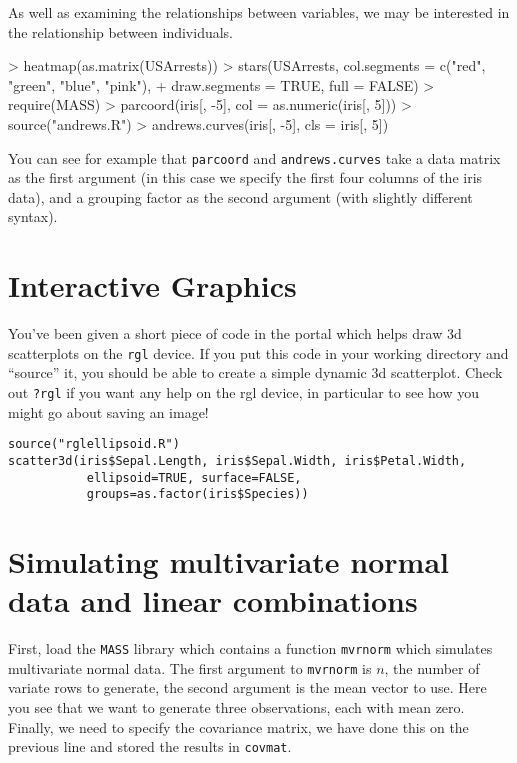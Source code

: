 As well as examining the relationships between variables, we may be interested in the relationship between individuals.

\begin{Schunk}
\begin{Sinput}
> heatmap(as.matrix(USArrests))
> stars(USArrests, col.segments = c("red", "green", "blue", "pink"), 
+     draw.segments = TRUE, full = FALSE)
> require(MASS)
> parcoord(iris[, -5], col = as.numeric(iris[, 5]))
> source("andrews.R")
> andrews.curves(iris[, -5], cls = iris[, 5])
\end{Sinput}
\end{Schunk}

You can see for example that \texttt{parcoord} and \texttt{andrews.curves} take a data matrix as the first argument (in this case we specify the first four columns of the iris data), and a grouping factor as the second argument (with slightly different syntax).


\section{Interactive Graphics}

You've been given a short piece of code in the portal which helps draw 3d scatterplots on the \texttt{rgl} device.   If you put this code in your working directory and ``source'' it, you should be able to create a simple dynamic 3d scatterplot.   Check out \texttt{?rgl} if you want any help on the rgl device, in particular to see how you might go about saving an image!


\begin{verbatim}
source("rglellipsoid.R")
scatter3d(iris$Sepal.Length, iris$Sepal.Width, iris$Petal.Width,
           ellipsoid=TRUE, surface=FALSE,
           groups=as.factor(iris$Species))
\end{verbatim}


\section{Simulating multivariate normal data and linear combinations}

First, load the \texttt{MASS} library which contains a function \texttt{mvrnorm} which simulates multivariate normal data.   The first argument to \texttt{mvrnorm} is $n$, the number of variate rows to generate, the second argument is the mean vector to use.   Here you see that we want to generate three observations, each with mean zero.   Finally, we need to specify the covariance matrix, we have done this on the previous line and stored the results in \texttt{covmat}.


